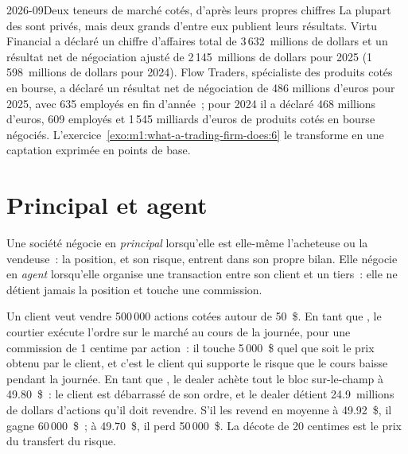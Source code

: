 \begin{dated}{2026-09}{Deux teneurs de marché cotés, d'après leurs propres chiffres}\label{dat:m1:what-a-trading-firm-does:listed}
La plupart des  sont privés, mais deux grands d'entre eux publient leurs résultats.
Virtu Financial a déclaré un chiffre d'affaires total de 3\,632~millions de dollars et un résultat net
de négociation ajusté de 2\,145~millions de dollars pour 2025 (1\,598~millions de dollars pour 2024).
Flow Traders, spécialiste des produits cotés en bourse, a déclaré un résultat net
de négociation de 486 millions d'euros pour 2025, avec 635 employés en fin d'année~; pour 2024
il a déclaré 468 millions d'euros, 609 employés et 1\,545 milliards d'euros de
produits cotés en bourse négociés. L'exercice~\ref{exo:m1:what-a-trading-firm-does:6}
le transforme en une captation exprimée en points de base.
\end{dated}

\section{Principal et agent}

\begin{definition}\label{def:m1:what-a-trading-firm-does:principal-agent}
Une société négocie en \emph{principal} lorsqu'elle est elle-même
l'acheteuse ou la vendeuse~: la position, et son risque, entrent dans son propre
bilan. Elle négocie en \emph{agent} lorsqu'elle organise une
transaction entre son client et un tiers~: elle ne détient jamais la position et
touche une commission.
\end{definition}

\begin{example}\label{ex:m1:what-a-trading-firm-does:twice}
Un client veut vendre 500\,000 actions cotées autour de 50~\$. En tant que
\emph{}, le courtier exécute l'ordre sur le marché au cours de la journée, pour une
commission de 1 centime par action~: il touche 5\,000~\$ quel que soit le prix
obtenu par le client, et c'est le client qui supporte le risque que le cours baisse pendant la journée.
En tant que \emph{}, le dealer achète tout le bloc sur-le-champ à 49.80~\$~:
le client est débarrassé de son ordre, et le dealer détient 24.9~millions de dollars d'actions qu'il doit
revendre. S'il les revend en moyenne à 49.92~\$, il gagne 60\,000~\$~; à 49.70~\$, il
perd 50\,000~\$. La décote de 20 centimes est le prix du transfert du risque.
\end{example}

